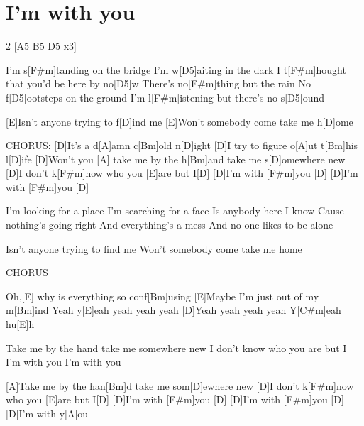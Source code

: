\section{I'm with you}
\begin{guitar}
\begin{multicols}{2}
[A5 B5 D5  x3]{}


I'm s[F#m]tanding on the bridge
I'm w[D5]aiting in the dark
I t[F#m]hought that you'd be here by no[D5]w
There's no[F#m]thing but the rain
No f[D5]ootsteps on the ground
I'm l[F#m]istening but there's no s[D5]ound


[E]Isn't anyone trying to f[D]ind me
[E]Won't somebody come take me h[D]ome


CHORUS:
[D]It's a d[A]amn c[Bm]old n[D]ight
[D]I try to figure o[A]ut t[Bm]his l[D]ife
[D]Won't you [A]{}  take me by the h[Bm]and take me s[D]omewhere new
[D]I don't k[F#m]now who you [E]are but I[D]{}
[D]I'm with [F#m]you  [D]{}
[D]I'm with [F#m]you  [D]{}


I'm looking for a place
I'm searching for a face
Is anybody here I know
Cause nothing's going right
And everything's a mess
And no one likes to be alone


Isn't anyone trying to find me
Won't somebody come take me home


CHORUS


Oh,[E] why is everything so conf[Bm]using
[E]Maybe I'm just out of my m[Bm]ind
Yeah y[E]eah yeah yeah yeah
[D]Yeah yeah yeah yeah
Y[C#m]eah hu[E]h


Take me by the hand take me somewhere new
I don't know who you are but I
I'm with you
I'm with you

[A]Take me by the han[Bm]d take me som[D]ewhere new
[D]I don't k[F#m]now who you [E]are but I[D]{}
[D]I'm with [F#m]you  [D]{}
[D]I'm with [F#m]you  [D]{}
[D]I'm with y[A]ou
\end{multicols}
\end{guitar}

